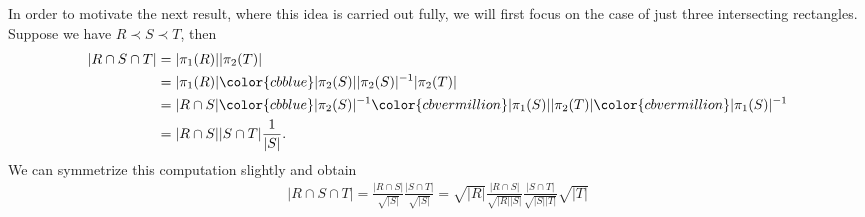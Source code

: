 \documentclass[oneside]{amsart}
\theoremstyle{definition}
\theoremstyle{plain}
\numberwithin{equation}{section}
\numberwithin{theorem}{section}
\begin{document}
In order to motivate the next result, where this idea is carried out fully, we
will first focus on the case of just three intersecting rectangles.
Suppose we have $R \prec S \prec T$, then
\begin{align*}
  |R \cap S \cap T| &= |\pi_1(R)||\pi_2(T)| \\
  &= |\pi_1(R)|
     {\color{cbblue}|\pi_2(S)| |\pi_2(S)|^{-1} }
    |\pi_2(T)| \\
  &= |R \cap S| { \color{cbblue} |\pi_2(S)|^{-1}}
      {\color{cbvermillion} |\pi_1(S)|} |\pi_2(T)|
      {\color{cbvermillion} |\pi_1(S)|^{-1}} \\
  &= |R \cap S| |S \cap T| \frac{1}{|S|}.
\end{align*}
We can symmetrize this computation slightly and obtain
\begin{align*}
  |R \cap S \cap T| =
    \frac{|R \cap S|}{\sqrt{|S|}}
    \frac{|S \cap T|}{\sqrt{|S|}}
    =
    \sqrt{|R|} \frac{|R \cap S|}{\sqrt{|R||S|}}
    \frac{|S \cap T|}{\sqrt{|S||T|}} \sqrt{|T|}
\end{align*}
\end{document}
